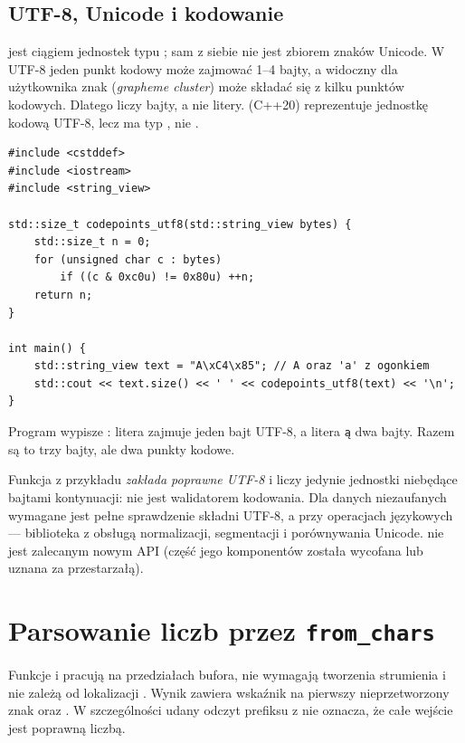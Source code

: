 \subsection{UTF-8, Unicode i kodowanie}

 jest ciągiem jednostek typu ; sam z siebie
nie jest zbiorem znaków Unicode. W UTF-8 jeden punkt kodowy może
zajmować 1--4 bajty, a widoczny dla użytkownika znak (\emph{grapheme
cluster}) może składać się z kilku punktów kodowych. Dlatego
 liczy bajty, a nie litery.  (C++20)
reprezentuje jednostkę kodową UTF-8, lecz  ma typ
, nie .

\begin{lstlisting}[caption={Rozmiar w bajtach i liczba punktow kodowych UTF-8.}]
#include <cstddef>
#include <iostream>
#include <string_view>

std::size_t codepoints_utf8(std::string_view bytes) {
    std::size_t n = 0;
    for (unsigned char c : bytes)
        if ((c & 0xc0u) != 0x80u) ++n;
    return n;
}

int main() {
    std::string_view text = "A\xC4\x85"; // A oraz 'a' z ogonkiem
    std::cout << text.size() << ' ' << codepoints_utf8(text) << '\n';
}
\end{lstlisting}

Program wypisze : litera  zajmuje jeden bajt UTF-8,
a litera \texttt{ą} dwa bajty. Razem są to trzy bajty, ale dwa punkty kodowe.

Funkcja z przykładu \emph{zakłada poprawne UTF-8} i liczy jedynie
jednostki niebędące bajtami kontynuacji: nie jest walidatorem kodowania.
Dla danych niezaufanych wymagane jest pełne sprawdzenie składni UTF-8,
a przy operacjach językowych --- biblioteka z obsługą normalizacji,
segmentacji i porównywania Unicode.  nie jest zalecanym
nowym API (część jego komponentów została wycofana lub uznana za
przestarzałą).

\section{Parsowanie liczb przez \texttt{from\_chars}}
\label{sec:cpp19-charconv}

Funkcje  i  pracują na
przedziałach bufora, nie wymagają tworzenia strumienia i nie zależą
od lokalizacji . Wynik  zawiera
wskaźnik na pierwszy nieprzetworzony znak oraz .
W szczególności udany odczyt prefiksu  z 
nie oznacza, że całe wejście jest poprawną liczbą.

